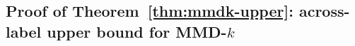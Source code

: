 \documentclass[aps,prx,reprint,superscriptaddress,amsmath,amssymb,longbibliography,floatfix]{revtex4-2}
\theoremstyle{plain}
\theoremstyle{definition}
\theoremstyle{remark}
\begin{document}









\subsection{Proof of Theorem~\ref{thm:mmdk-upper}: across-label upper bound for MMD-$k$}\label{app:mmdk-upper-bound}
\end{document}
